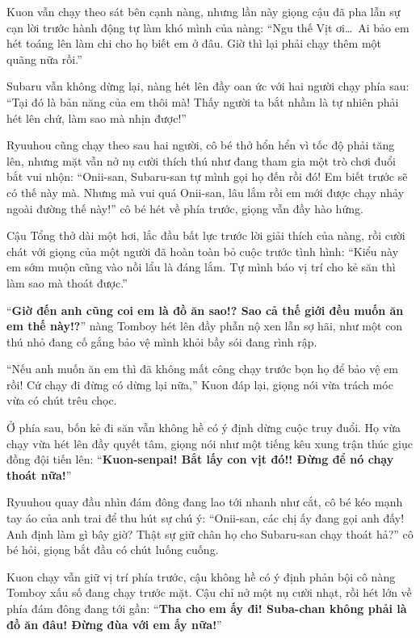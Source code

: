 \documentclass[../main.tex]{subfiles}
\begin{document}
Kuon vẫn chạy theo sát bên cạnh nàng, nhưng lần này giọng cậu đã pha lẫn sự cạn lời trước hành động tự làm khó mình của nàng: ``Ngu thế Vịt ơi\dots\ Ai bảo em hét toáng lên làm chi cho họ biết em ở đâu. Giờ thì lại phải chạy thêm một quãng nữa rồi.''

Subaru vẫn không dừng lại, nàng hét lên đầy oan ức với hai người chạy phía sau: ``Tại đó là bản năng của em thôi mà! Thấy người ta bắt nhầm là tự nhiên phải hét lên chứ, làm sao mà nhịn được!''

Ryuuhou cũng chạy theo sau hai người, cô bé thở hổn hển vì tốc độ phải tăng lên, nhưng mặt vẫn nở nụ cười thích thú như đang tham gia một trò chơi đuổi bắt vui nhộn: ``Onii-san, Subaru-san tự mình gọi họ đến rồi đó! Em biết trước sẽ có thế này mà. Nhưng mà vui quá Onii-san, lâu lắm rồi em mới được chạy nhảy ngoài đường thế này!'' cô bé hét về phía trước, giọng vẫn đầy hào hứng.

Cậu Tổng thở dài một hơi, lắc đầu bất lực trước lời giải thích của nàng, rồi cười chát với giọng của một người đã hoàn toàn bỏ cuộc trước tình hình: ``Kiểu này em sớm muộn cũng vào nồi lẩu là đáng lắm. Tự mình báo vị trí cho kẻ săn thì làm sao mà thoát được.''

``\textbf{Giờ đến anh cũng coi em là đồ ăn sao!? Sao cả thế giới đều muốn ăn em thế này!?}'' nàng Tomboy hét lên đầy phẫn nộ xen lẫn sợ hãi, như một con thú nhỏ đang cố gắng bảo vệ mình khỏi bầy sói đang rình rập.

``Nếu anh muốn ăn em thì đã không mất công chạy trước bọn họ để bảo vệ em rồi! Cứ chạy đi đừng có dừng lại nữa,'' Kuon đáp lại, giọng nói vừa trách móc vừa có chút trêu chọc.

Ở phía sau, bốn kẻ đi săn vẫn không hề có ý định dừng cuộc truy đuổi. Họ vừa chạy vừa hét lên đầy quyết tâm, giọng nói như một tiếng kêu xung trận thúc giục đồng đội tiến lên: ``\textbf{Kuon-senpai! Bắt lấy con vịt đó!! Đừng để nó chạy thoát nữa!}''

Ryuuhou quay đầu nhìn đám đông đang lao tới nhanh như cắt, cô bé kéo mạnh tay áo của anh trai để thu hút sự chú ý: ``Onii-san, các chị ấy đang gọi anh đấy! Anh định làm gì bây giờ? Thật sự giữ chân họ cho Subaru-san chạy thoát hả?'' cô bé hỏi, giọng bắt đầu có chút luống cuống.

Kuon chạy vẫn giữ vị trí phía trước, cậu không hề có ý định phản bội cô nàng Tomboy xấu số đang chạy trước mặt. Cậu chỉ nở một nụ cười nhạt, rồi hét lớn về phía đám đông đang tới gần: ``\textbf{Tha cho em ấy đi! Suba-chan không phải là đồ ăn đâu! Đừng đùa với em ấy nữa!}''
\end{document}

